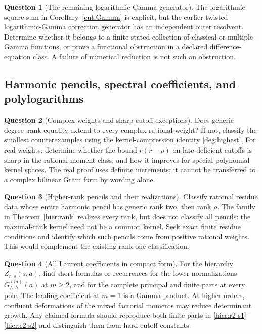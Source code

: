 \documentclass[11pt]{article}
\theoremstyle{definition}
\newtheorem{question}{Question}
\theoremstyle{remark}
\numberwithin{equation}{section}
\begin{document}
\begin{question}[The remaining logarithmic Gamma generator]
The logarithmic square sum in Corollary~\ref{cut:Gamma} is explicit,
but the earlier twisted logarithmic-Gamma correction generator has
an independent outer resolvent. Determine whether it belongs to a
finite stated collection of classical or multiple-Gamma functions,
or prove a functional obstruction in a declared difference-equation
class. A failure of numerical reduction is not such an obstruction.
\end{question}

\subsection{Harmonic pencils, spectral coefficients, and polylogarithms}

\begin{question}[Complex weights and sharp cutoff exceptions]
Does generic degree--rank equality extend to every complex rational
weight? If not, classify the smallest counterexamples using the
kernel-compression identity \eqref{deg:highest}. For real weights,
determine whether the bound $r(r-\rho)$ on late deficient cutoffs is
sharp in the rational-moment class, and how it improves for special
polynomial kernel spaces. The real proof uses definite increments;
it cannot be transferred to a complex bilinear Gram form by wording
alone.
\end{question}

\begin{question}[Higher-rank pencils and their realizations]
Classify rational residue data whose entire harmonic pencil has
generic rank two, then rank $\rho$. The family in
Theorem~\ref{hier:rank} realizes every rank, but does not classify all
pencils: the maximal-rank kernel need not be a common kernel.
Seek exact finite residue conditions and identify which such pencils
come from positive rational weights. This would complement the
existing rank-one classification.
\end{question}

\begin{question}[All Laurent coefficients in compact form]
For the hierarchy $Z_{r,\rho}(s,a)$, find short formulas or recurrences
for the lower normalizations $G_{L,h}^{(m)}(a)$ at $m\ge2$, and for
the complete principal and finite parts at every pole. The leading
coefficient at $m=1$ is a Gamma product. At higher orders, confluent
deformations of the mixed factorial moments may reduce determinant
growth. Any claimed formula should reproduce both finite parts in
\eqref{hier:r2-s1}--\eqref{hier:r2-s2} and distinguish them from
hard-cutoff constants.
\end{question}
\end{document}
